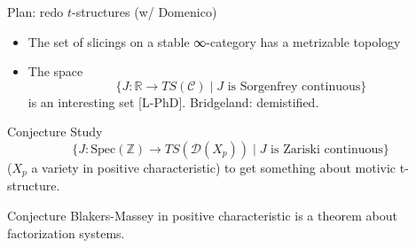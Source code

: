 \documentclass[handout]{beamer}
\def\lnk#1{\href{#1}{\faFilePdfO}}
\begin{document}
%
%
%
%
%
\begin{frame}{Plan: redo $t$-structures (w/ Domenico)}\small
   \begin{itemize}
     \item<+-> The set of \alert{slicings} on a stable ∞-category has a metrizable topology

     \item<+-> The space \[\{ J \colon \mathbb R \to TS(\mathcal C) \mid J \text{ is Sorgenfrey continuous} \}\]
     is an interesting set [\alert{L-PhD}\lnk{http://tetrapharmakon.github.io/stuff/main.pdf}]. Bridgeland: demistified.
    \end{itemize}

    \onslide<+->
    \begin{block}{Conjecture}
\vspace{.5mm}
  Study
\[\{ J \colon \text{Spec}(\mathbb Z) \to TS(\mathcal D(X_p)) \mid J \text{ is Zariski continuous} \}\]
($X_p$ a variety in positive characteristic) to get something about motivic t-structure.
 \end{block}
 \onslide<+->
 \begin{block}{Conjecture}
\vspace{.5mm}
 Blakers-Massey in positive characteristic is a theorem about factorization systems.
 \end{block}
\end{frame}
%
%
%
%
\end{document}

